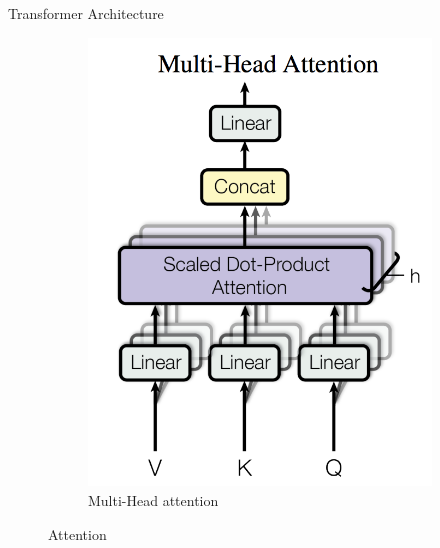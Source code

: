 \documentclass[final]{beamer}
\newlength{\onecolwid}
\newlength{\twocolwid}
\begin{document}
\begin{frame}[t]
\begin{columns}[t]
\begin{column}{\twocolwid}
\begin{columns}[t,totalwidth=\twocolwid]
\begin{column}{\onecolwid}
\begin{block}{Transformer Architecture}
\begin{figure}
\begin{subfigure}{.5\textwidth}
  \includegraphics[scale=0.98]{multihead.png}
  \caption{Multi-Head attention}
  \label{fig:sub2}
\end{subfigure}
\caption{Attention}
\label{fig:test}
\end{figure}


\end{block}
\end{column}
\end{columns}
\end{column}
\end{columns}
\end{frame}
\end{document}
